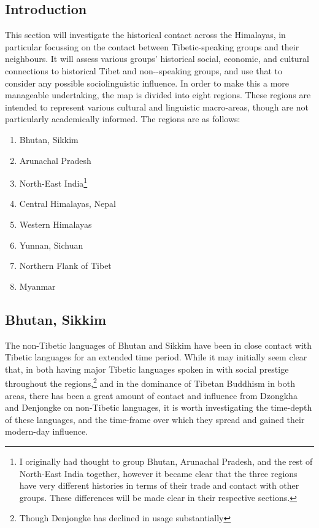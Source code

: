\subsection{Introduction}
This section will investigate the historical contact across the Himalayas, in particular focussing on the contact between Tibetic-speaking groups and their neighbours. It will assess various groups' historical social, economic, and cultural connections to historical Tibet and non-\lfam-speaking groups, and use that to consider any possible sociolinguistic influence. In order to make this a more manageable undertaking, the map is divided into eight regions. These regions are intended to represent various cultural and linguistic macro-areas, though are not particularly academically informed. The regions are as follows:
\begin{enumerate}
    \item Bhutan, Sikkim
    \item Arunachal Pradesh 
    \item North-East India\footnote{I originally had thought to group Bhutan, Arunachal Pradesh, and the rest of North-East India together, however it became clear that the three regions have very different histories in terms of their trade and contact with other groups. These differences will be made clear in their respective sections.}
    \item Central Himalayas, Nepal
    \item Western Himalayas
    \item Yunnan, Sichuan
    \item Northern Flank of Tibet
    \item Myanmar
\end{enumerate}
\subsection{Bhutan, Sikkim}
The non-Tibetic languages of Bhutan and Sikkim have been in close contact with Tibetic languages for an extended time period. While it may initially seem clear that, in both having major Tibetic languages spoken in with social prestige throughout the regions,\footnote{Though Denjongke has declined in usage substantially} and in the dominance of Tibetan Buddhism in both areas, there has been a great amount of contact and influence from Dzongkha and Denjongke on non-Tibetic languages, it is worth investigating the time-depth of these languages, and the time-frame over which they spread and gained their modern-day influence. 

